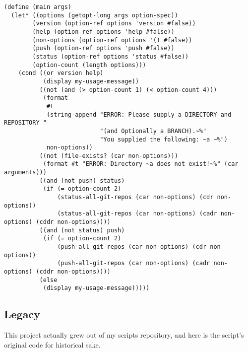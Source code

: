 \documentclass[11pt]{article}
\begin{document}
\begin{verbatim}
(define (main args)
  (let* ((options (getopt-long args option-spec))
        (version (option-ref options 'version #false))
        (help (option-ref options 'help #false))
        (non-options (option-ref options '() #false))
        (push (option-ref options 'push #false))
        (status (option-ref options 'status #false))
        (option-count (length options)))
    (cond ((or version help)
           (display my-usage-message))
          ((not (and (> option-count 1) (< option-count 4)))
           (format
            #t
            (string-append "ERROR: Please supply a DIRECTORY and REPOSITORY "
                           "(and Optionally a BRANCH).~%"
                           "You supplied the following: ~a ~%")
            non-options))
          ((not (file-exists? (car non-options)))
           (format #t "ERROR: Directory ~a does not exist!~%" (car arguments)))
          ((and (not push) status)
           (if (= option-count 2)
               (status-all-git-repos (car non-options) (cdr non-options))
               (status-all-git-repos (car non-options) (cadr non-options) (cddr non-options))))
          ((and (not status) push)
           (if (= option-count 2)
               (push-all-git-repos (car non-options) (cdr non-options))
               (push-all-git-repos (car non-options) (cadr non-options) (cddr non-options))))
          (else
           (display my-usage-message)))))
\end{verbatim}

\subsection{Legacy}
\label{sec:org1336198}
This project actually grew out of my scripts repository, and here is the
script's original code for historical sake.
\end{document}
